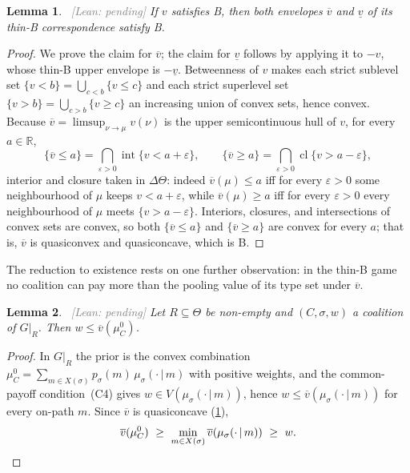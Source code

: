 \documentclass[11pt]{article}
\newtheorem{lemma}{Lemma}
\newcommand{\sep}{\,|\,}
\newcommand{\leanpending}{{\footnotesize\textsf{\textcolor{gray}{[Lean: pending]}}}}
\begin{document}
\begin{lemma}\label{lem:thinB-envelope-B}\ \leanpending
    If $v$ satisfies B, then both envelopes $\overline v$ and $\underline v$ of
    its thin-B correspondence satisfy B.
\end{lemma}
\begin{proof}
    We prove the claim for $\overline v$; the claim for $\underline v$ follows by
    applying it to $-v$, whose thin-B upper envelope is $-\underline v$.
    Betweenness of $v$ makes each strict sublevel set
    $\{v<b\}=\bigcup_{c<b}\{v\le c\}$ and each strict superlevel set
    $\{v>b\}=\bigcup_{c>b}\{v\ge c\}$ an increasing union of convex sets, hence
    convex. Because $\overline v=\limsup_{\nu\to\mu}v(\nu)$ is the upper
    semicontinuous hull of $v$, for every $a\in\mathbb{R}$,
    \[
        \{\overline v\le a\}=\bigcap_{\varepsilon>0}\operatorname{int}\{v<a+\varepsilon\},
        \qquad
        \{\overline v\ge a\}=\bigcap_{\varepsilon>0}\operatorname{cl}\{v>a-\varepsilon\},
    \]
    interior and closure taken in $\Delta\Theta$: indeed $\overline v(\mu)\le a$
    iff for every $\varepsilon>0$ some neighbourhood of $\mu$ keeps
    $v<a+\varepsilon$, while $\overline v(\mu)\ge a$ iff for every $\varepsilon>0$
    every neighbourhood of $\mu$ meets $\{v>a-\varepsilon\}$. Interiors,
    closures, and intersections of convex sets are convex, so both
    $\{\overline v\le a\}$ and $\{\overline v\ge a\}$ are convex for every $a$;
    that is, $\overline v$ is quasiconvex and quasiconcave, which is B.
\end{proof}

The reduction to existence rests on one further observation: in the thin-B game
no coalition can pay more than the pooling value of its type set under
$\overline v$.

\begin{lemma}\label{lem:thinB-value-bound}\ \leanpending
    Let $R\subseteq\Theta$ be non-empty and $(C,\sigma,w)$ a coalition of
    $G\vert_R$. Then $w\le\overline v(\mu^0_C)$.
\end{lemma}
\begin{proof}
    In $G\vert_R$ the prior is the convex combination
    $\mu^0_C=\sum_{m\in X(\sigma)}p_\sigma(m)\,\mu_\sigma(\cdot\sep m)$ with
    positive weights, and the common-payoff condition~(C4) gives
    $w\in V(\mu_\sigma(\cdot\sep m))$, hence
    $w\le\overline v(\mu_\sigma(\cdot\sep m))$ for every on-path $m$. Since
    $\overline v$ is quasiconcave (\cref{lem:thinB-envelope-B}),
    \[
        \overline v(\mu^0_C)\ \ge\ \min_{m\in X(\sigma)}\overline v(\mu_\sigma(\cdot\sep m))\ \ge\ w. \qedhere
    \]
\end{proof}
\end{document}
